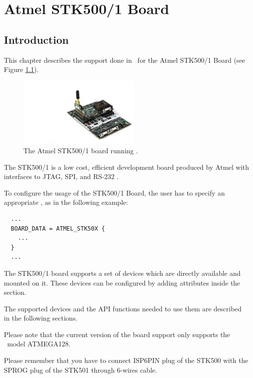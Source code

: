 \chapter[Atmel STK500/1 Board]{Atmel STK500/1 Board}

\section{Introduction}

This chapter describes the support done in \ee\ for the
Atmel STK500/1 Board (see Figure \ref{fig:stk500-501}).

\begin{figure}
  \begin{center}
    \includegraphics[width=6cm, bb=0 0 402 228]{images/atmel_zig.jpg}
  \end{center}
  \caption{The Atmel STK500/1 board running \ee.}
  \label{fig:stk500-501}
\end{figure}

The STK500/1 is a low cost, efficient development board produced by
Atmel with interfaces to JTAG, SPI, and RS-232 \cite{atmelZigbee}.

To configure the usage of the STK500/1 Board, the user has to specify an
appropriate , as in the following example:

\begin{lstlisting}
  ...
  BOARD_DATA = ATMEL_STK50X {
    ...
  }
  ...
\end{lstlisting}

The STK500/1 board supports a set of devices which are directly
available and mounted on it. These devices can be configured by adding
attributes inside the  section.

The supported devices and the API functions needed to use them are
described in the following sections.

Please note that the current version of the board support only
supports the \avr\ model ATMEGA128.

Please remember that you have to connect ISP6PIN plug of the STK500
with the SPROG plug of the STK501 through 6-wires cable.



